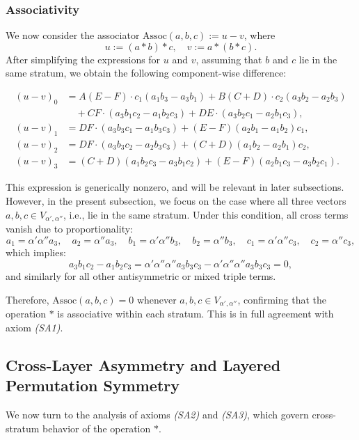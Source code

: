 \documentclass[12pt]{article}
\theoremstyle{definition}
\theoremstyle{plain}
\theoremstyle{remark}
\begin{document}
\subsubsection{Associativity}

We now consider the associator \( \mathrm{Assoc}(a, b, c) := u - v \), where
\[
u := (a * b) * c, \quad v := a * (b * c).
\]
After simplifying the expressions for \( u \) and \( v \), assuming that \( b \) and \( c \) lie in the same stratum, we obtain the following component-wise difference:

\begin{align*}
(u - v)_0 &= A(E - F) \cdot c_1 (a_1 b_3 - a_3 b_1)
+ B(C + D) \cdot c_2 (a_3 b_2 - a_2 b_3) \\
&\quad + CF \cdot (a_3 b_1 c_2 - a_1 b_2 c_3)
+ DE \cdot (a_3 b_2 c_1 - a_2 b_1 c_3), \\[1ex]
%
(u - v)_1 &= DF \cdot (a_3 b_3 c_1 - a_1 b_3 c_3)
+ (E - F)(a_2 b_1 - a_1 b_2) c_1, \\[1ex]
%
(u - v)_2 &= DF \cdot (a_3 b_3 c_2 - a_2 b_3 c_3)
+ (C + D)(a_1 b_2 - a_2 b_1) c_2, \\[1ex]
%
(u - v)_3 &= (C + D)(a_1 b_2 c_3 - a_3 b_1 c_2)
+ (E - F)(a_2 b_1 c_3 - a_3 b_2 c_1).
\end{align*}

This expression is generically nonzero, and will be relevant in later subsections. However, in the present subsection, we focus on the case where all three vectors \( a, b, c \in V_{\alpha', \alpha''} \), i.e., lie in the same stratum. Under this condition, all cross terms vanish due to proportionality:
\[
a_1 = \alpha' \alpha'' a_3, \quad a_2 = \alpha'' a_3, \quad
b_1 = \alpha' \alpha'' b_3, \quad b_2 = \alpha'' b_3, \quad
c_1 = \alpha' \alpha'' c_3, \quad c_2 = \alpha'' c_3,
\]
which implies:
\[
a_3 b_1 c_2 - a_1 b_2 c_3 = \alpha' \alpha'' \alpha'' a_3 b_3 c_3 - \alpha' \alpha'' \alpha'' a_3 b_3 c_3 = 0,
\]
and similarly for all other antisymmetric or mixed triple terms.

Therefore, \( \mathrm{Assoc}(a, b, c) = 0 \) whenever \( a, b, c \in V_{\alpha', \alpha''} \), confirming that the operation \( * \) is associative within each stratum. This is in full agreement with axiom \emph{(SA1)}.

\subsection{Cross-Layer Asymmetry and Layered Permutation Symmetry}

We now turn to the analysis of axioms \emph{(SA2)} and \emph{(SA3)}, which govern cross-stratum behavior of the operation \( * \).
\end{document}
